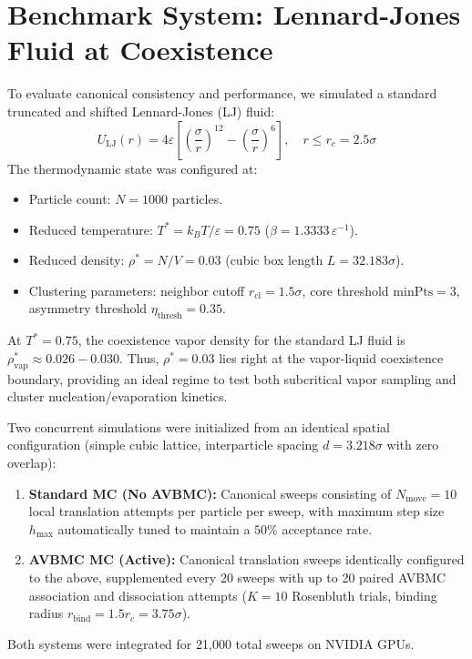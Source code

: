\documentclass[11pt,a4paper]{article}
\begin{document}
\section{Benchmark System: Lennard-Jones Fluid at Coexistence}

To evaluate canonical consistency and performance, we simulated a standard truncated and shifted Lennard-Jones (LJ) fluid:
\begin{equation}
U_{\mathrm{LJ}}(r) = 4\varepsilon \left[ \left(\frac{\sigma}{r}\right)^{12} - \left(\frac{\sigma}{r}\right)^6 \right], \quad r \le r_c = 2.5\sigma
\end{equation}
The thermodynamic state was configured at:
\begin{itemize}
    \item Particle count: $N = 1000$ particles.
    \item Reduced temperature: $T^* = k_B T / \varepsilon = 0.75$ ($\beta = 1.3333\,\varepsilon^{-1}$).
    \item Reduced density: $\rho^* = N / V = 0.03$ (cubic box length $L = 32.183\sigma$).
    \item Clustering parameters: neighbor cutoff $r_{\mathrm{cl}} = 1.5\sigma$, core threshold $\text{minPts} = 3$, asymmetry threshold $\eta_{\mathrm{thresh}} = 0.35$.
\end{itemize}
At $T^* = 0.75$, the coexistence vapor density for the standard LJ fluid is $\rho_{\mathrm{vap}}^* \approx 0.026 - 0.030$. Thus, $\rho^* = 0.03$ lies right at the vapor-liquid coexistence boundary, providing an ideal regime to test both subcritical vapor sampling and cluster nucleation/evaporation kinetics.

Two concurrent simulations were initialized from an identical spatial configuration (simple cubic lattice, interparticle spacing $d = 3.218\sigma$ with zero overlap):
\begin{enumerate}
    \item \textbf{Standard MC (No AVBMC):} Canonical sweeps consisting of $N_{\mathrm{move}} = 10$ local translation attempts per particle per sweep, with maximum step size $h_{\mathrm{max}}$ automatically tuned to maintain a $50\%$ acceptance rate.
    \item \textbf{AVBMC MC (Active):} Canonical translation sweeps identically configured to the above, supplemented every 20 sweeps with up to 20 paired AVBMC association and dissociation attempts ($K = 10$ Rosenbluth trials, binding radius $r_{\mathrm{bind}} = 1.5 r_c = 3.75\sigma$).
\end{enumerate}
Both systems were integrated for 21,000 total sweeps on NVIDIA GPUs.
\end{document}

